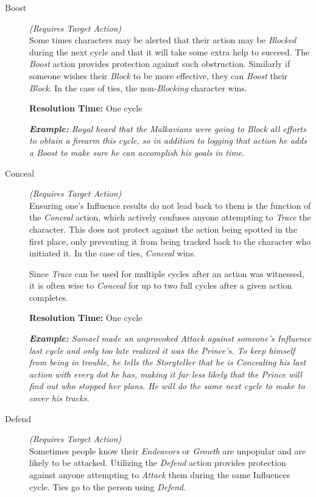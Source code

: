 \begin{description}
	\item[Boost] \emph{(Requires Target Action)} \hfill \\
		Some times characters may be alerted that their action may be \emph{Blocked} during the next 
		cycle and that it will take some extra help to succeed.  The \emph{Boost} action provides 
		protection against such obstruction.  Similarly if someone wishes their \emph{Block} to be 
		more effective, they can \emph{Boost} their \emph{Block}.  In the case of ties, the non-\emph{Blocking} 
		character wins.
		
		\textbf{Resolution Time:} One cycle
		
		\emph{\textbf{Example:}  Royal heard that the Malkavians were going to \emph{Block} all efforts to 
		obtain a firearm this cycle, so in addition to logging that action he adds a \emph{Boost} to make sure he 
		can accomplish his goals in time.} \\
		
	\item[Conceal] \emph{(Requires Target Action)} \hfill \\
		Ensuring one's Influence results do not lead back to them is the function of the \emph{Conceal} 
		action, which actively confuses anyone attempting to \emph{Trace} the character.  This 
		does not protect against the action being spotted in the first place, only preventing it from 
		being tracked back to the character who initiated it.  In the case of ties, \emph{Conceal} wins.
		
		Since \emph{Trace} can be used for multiple cycles after an action was witnessed, it is often wise 
		to \emph{Conceal} for up to two full cycles after a given action completes.
		
		\textbf{Resolution Time:} One cycle
		
		\emph{\textbf{Example:} Samael made an unprovoked \emph{Attack} against someone's Influence last cycle 
		and only too late realized it was the Prince's.  To keep himself from being in trouble, he 
		tells the Storyteller that he is \emph{Concealing} his last action with every dot he has, making 
		it far less likely that the Prince will find out who stopped her plans.  He will do the same next cycle 
		to make to cover his tracks.} \\
		
	\item[Defend] \emph{(Requires Target Action)} \hfill \\
		Sometimes people know their \emph{Endeavors} or \emph{Growth} are unpopular and are likely to be attacked.  
		Utilizing the \emph{Defend} action provides protection against anyone attempting to \emph{Attack} them 
		during the same Influences cycle.  Ties go to the person using \emph{Defend}. 
		

\end{description}
